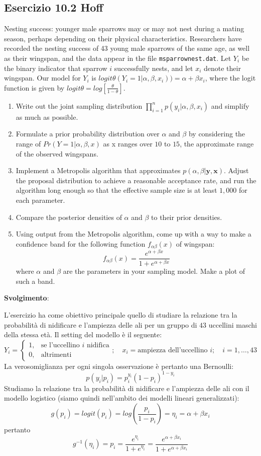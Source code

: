 \subsection*{Esercizio 10.2 Hoff} %

Nesting success: younger male sparrows may or may not nest during a mating season, perhaps depending on their physical characteristics. Researchers have recorded the nesting success of 43 young male sparrows of the same age, as well as their wingspan, and the data appear in the file \texttt{msparrownest.dat}. Let $Y_i$ be the binary indicator that sparrow $i$ successfully nests, and let $x_i$ denote their wingspan. Our model for $Y_i$ is $logit\theta(Y_i = 1|\alpha, \beta, x_i)) = \alpha + \beta x_i$, where the logit function is given by $logit \theta = log\left[\frac{\theta}{1-\theta}\right]$.
\begin{enumerate}
  \item Write out the joint sampling distribution  $\prod_{i=1}^{n}p(y_i | \alpha, \beta, x_i)$ and simplify as much as possible.
  \item Formulate a prior probability distribution over $\alpha$ and $\beta$ by considering the range of $Pr(Y = 1|\alpha,\beta,x)$ as x ranges over $10$ to $15$, the approximate range of the observed wingspans.
  \item Implement a Metropolis algorithm that approximates $p(\alpha, \beta|\mathbf{y}, \mathbf{x})$. Adjust the proposal distribution to achieve a reasonable acceptance rate, and run the algorithm long enough so that the effective sample size is at least $1,000$ for each parameter.
  \item Compare the posterior densities of $\alpha$ and $\beta$ to their prior densities.
  \item Using output from the Metropolis algorithm, come up with a way to make a confidence band for the following function $f_{\alpha\beta}(x)$ of wingspan:
  $$f_{\alpha\beta}(x) = \frac{e^{\alpha + \beta x}}{1+e^{\alpha + \beta x}}$$
  where $\alpha$ and $\beta$ are the parameters in your sampling model. Make a plot of such a band.
\end{enumerate}


\textbf{Svolgimento}:
\bigskip

L'esercizio ha come obiettivo principale quello di studiare la relazione tra la probabilità di nidificare e l'ampiezza delle ali per un gruppo di $43$ uccellini maschi della stessa età. 
Il setting del modello è il seguente:
$$Y_i = \begin{cases} 1, & \mbox{se l'uccellino } i\mbox{ nidifica} \\ 0, & \mbox{altrimenti } \end{cases}; \quad x_i = \text{ampiezza dell'uccellino } i; \quad i = 1, \dots, 43$$
La verosomiglianza per ogni singola osservazione è pertanto una Bernoulli:
$$p(y_i | p_i) = p_i^{y_i}(1-p_i)^{1-y_i}$$
Studiamo la relazione tra la probabilità di nidificare e l'ampiezza delle ali con il modello logistico (siamo quindi nell'ambito dei modelli lineari generalizzati):
$$g(p_i) = logit(p_i) = log\left(\frac{p_i}{1-p_i}\right) = \eta_i = \alpha + \beta x_i$$
pertanto
$$g^{-1}(\eta_i) = p_i = \frac{e^{\eta_i}}{1+e^{\eta_i}} = \frac{e^{\alpha + \beta x_i}}{1+e^{\alpha + \beta x_i}}$$

